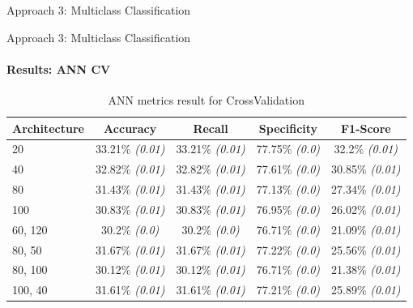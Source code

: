 \documentclass[9pt, pstricks, xcolor=dvipsnames]{beamer}
\begin{document}
\begin{frame}{Approach 3: Multiclass Classification}

\end{frame}
\begin{frame}{Approach 3: Multiclass Classification}
\framesubtitle{Results: ANN CV}
\begin{table}[H]
\centering
\begin{tabular}{lcccc}
\toprule
Architecture & Accuracy & Recall & Specificity & F1-Score \\\midrule
20 & 33.21\% \textit{(0.01)} & 33.21\% \textit{(0.01)} & 77.75\% \textit{(0.0)} & 32.2\% \textit{(0.01)} \\
40 & 32.82\% \textit{(0.01)} & 32.82\% \textit{(0.01)} & 77.61\% \textit{(0.0)} & 30.85\% \textit{(0.01)} \\
80 & 31.43\% \textit{(0.01)} & 31.43\% \textit{(0.01)} & 77.13\% \textit{(0.0)} & 27.34\% \textit{(0.01)} \\
100 & 30.83\% \textit{(0.01)} & 30.83\% \textit{(0.01)} & 76.95\% \textit{(0.0)} & 26.02\% \textit{(0.01)} \\
60, 120 & 30.2\% \textit{(0.0)} & 30.2\% \textit{(0.0)} & 76.71\% \textit{(0.0)} & 21.09\% \textit{(0.01)} \\
80, 50 & 31.67\% \textit{(0.01)} & 31.67\% \textit{(0.01)} & 77.22\% \textit{(0.0)} & 25.56\% \textit{(0.01)} \\
80, 100 & 30.12\% \textit{(0.01)} & 30.12\% \textit{(0.01)} & 76.71\% \textit{(0.0)} & 21.38\% \textit{(0.01)} \\
100, 40 & 31.61\% \textit{(0.01)} & 31.61\% \textit{(0.01)} & 77.21\% \textit{(0.0)} & 25.89\% \textit{(0.01)} \\


\bottomrule
\end{tabular}
\caption{ANN metrics result for CrossValidation}
\label{tab:ann_CV_approach3}
\end{table}

\end{frame}
\end{document}
